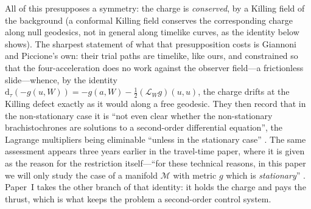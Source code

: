 \documentclass[12pt]{iopart}
\theoremstyle{plain}
\theoremstyle{definition}
\theoremstyle{remark}
\newcommand{\dd}{\mathrm{d}}
\begin{document}
All of this presupposes a symmetry: the charge is \emph{conserved},
by a Killing field of the background (a conformal Killing field conserves the
corresponding charge along null geodesics, not in general along timelike curves, as the
identity below shows). The sharpest statement
of what that presupposition costs is Giannoni and Piccione's own: their trial paths
are timelike, like ours, and constrained so that the four-acceleration does no work
against the observer field---a frictionless slide---whence, by the identity
$\dd_\tau(-g(u,W))=-g(a,W)-\tfrac12(\mathcal L_Wg)(u,u)$, the charge drifts at the
Killing defect exactly as it would along a free geodesic. They then record that in
the non-stationary case it is ``not even clear whether the non-stationary
brachistochrones are solutions to a second-order differential equation'', the
Lagrange multipliers being eliminable ``unless in the stationary case''
\cite[\S1]{GiannoniPiccione2002}. The same assessment appears three years earlier
in the travel-time paper, where it is given as the reason for the restriction
itself---``for these technical reasons, in this paper we will only study the case
of a manifold $\mathcal M$ with metric $g$ which is \emph{stationary}''
\cite[\S1]{GiannoniPiccioneTausk2002}. Paper~I takes the other branch of that identity:
it holds the charge and pays the thrust, which is what keeps the problem a
second-order control system.
\end{document}
